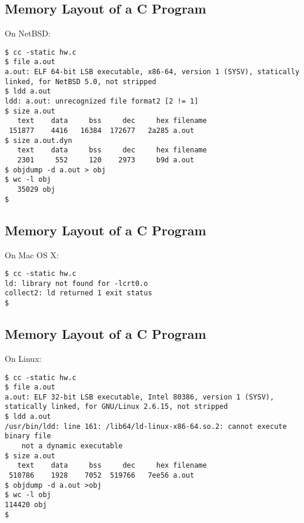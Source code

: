 \documentclass[xga]{xdvislides}
\begin{document}
\subsection{Memory Layout of a C Program}
On NetBSD:
\begin{verbatim}
$ cc -static hw.c
$ file a.out
a.out: ELF 64-bit LSB executable, x86-64, version 1 (SYSV), statically
linked, for NetBSD 5.0, not stripped
$ ldd a.out
ldd: a.out: unrecognized file format2 [2 != 1]
$ size a.out
   text    data     bss     dec     hex filename
 151877    4416   16384  172677   2a285 a.out
$ size a.out.dyn
   text    data     bss     dec     hex filename
   2301     552     120    2973     b9d a.out
$ objdump -d a.out > obj
$ wc -l obj
   35029 obj
$
\end{verbatim}

\subsection{Memory Layout of a C Program}
On Mac OS X:
\begin{verbatim}
$ cc -static hw.c
ld: library not found for -lcrt0.o
collect2: ld returned 1 exit status
$
\end{verbatim}

\subsection{Memory Layout of a C Program}
On Linux:
\begin{verbatim}
$ cc -static hw.c
$ file a.out
a.out: ELF 32-bit LSB executable, Intel 80386, version 1 (SYSV),
statically linked, for GNU/Linux 2.6.15, not stripped
$ ldd a.out
/usr/bin/ldd: line 161: /lib64/ld-linux-x86-64.so.2: cannot execute binary file
	not a dynamic executable
$ size a.out
   text	   data	    bss	    dec	    hex	filename
 510786	   1928	   7052	 519766	  7ee56	a.out
$ objdump -d a.out >obj
$ wc -l obj
114420 obj
$
\end{verbatim}

%
\end{document}
